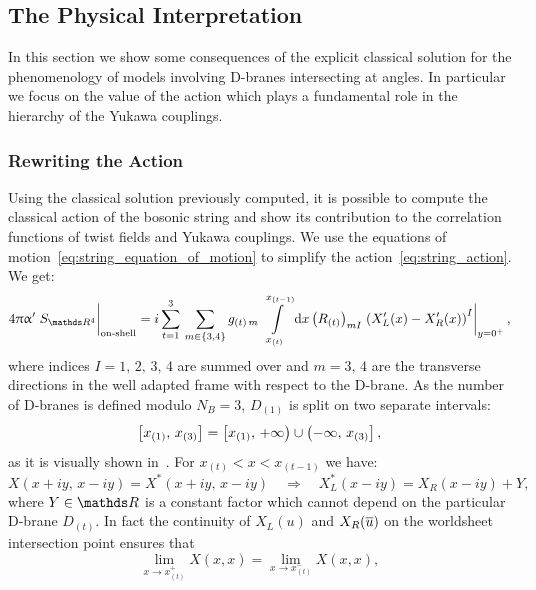 \subsection{The Physical Interpretation}

In this section we show some consequences of the explicit classical solution for the phenomenology of models involving D-branes intersecting at angles.
In particular we focus on the value of the action which plays a fundamental role in the hierarchy of the Yukawa couplings.


\subsubsection{Rewriting the Action}

Using the classical solution previously computed, it is possible to compute the classical action of the bosonic string and show its contribution to the correlation functions of twist fields and Yukawa couplings.
We use the equations of motion~\eqref{eq:string_equation_of_motion} to simplify the action~\eqref{eq:string_action}.
We get:
\begin{equation}
  4 \pi \ap \eval{S_{\R^4}}_{\text{on-shell}}
  =
  i \finitesum{t}{1}{3}\,
  \sum\limits_{m \in \{3, 4\}}
  g_{(t)\, m}\,
  \finiteint{x}{x_{(t)}}{x_{(t-1)}}
  \tensor{\qty( R_{(t)} )}{_{mI}}
  \eval{\qty( X_L'(x) - X_R'(x) )^I}_{y=0^+},
  \label{eq:area_tmp}
\end{equation}
where indices $I = 1,\, 2,\, 3,\, 4$ are summed over and $m = 3,\, 4$ are the transverse directions in the well adapted frame with respect to the D-brane.
As the number of D-branes is defined modulo $N_B = 3$, $D_{(1)}$ is split on two separate intervals:
\begin{equation}
  \qty[ x_{(1)},\, x_{(3)} ]
  =
  \left[ x_{(1)},\, +\infty \right)
  \cup
  \left( -\infty,\, x_{(3)} \right],
\end{equation}
as it is visually shown in~.
For $x_{(t)} < x < x_{(t-1)}$ we have:
\begin{equation}
  X(x+iy,\, x-iy)
  =
  X^*(x+iy,\, x-iy)
  \quad
  \Rightarrow
  \quad
  X_L^*(x-iy)
  =
  X_R(x-iy) + Y,
\end{equation}
where $Y \in \R$ is a constant factor which cannot depend on the particular D-brane $D_{(t)}$.
In fact the continuity of $X_L(u)$ and $X_R(\overline{u})$ on the worldsheet intersection point ensures that
\begin{equation}
  \lim\limits_{x \to x_{(t)}^+} X(x, x)
  =
  \lim\limits_{x \to x_{(t)}^-} X(x, x),
\end{equation}
